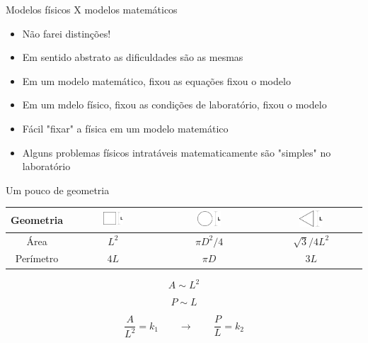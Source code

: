 \documentclass{beamer}
\newcommand{\lra}{\ensuremath{\longrightarrow}}
\newcommand{\qqrq}{\ensuremath{\qquad\lra\qquad}}
\begin{document}
\begin{frame}{Modelos físicos X modelos matemáticos}
  \begin{itemize}
  \item Não farei distinções!
  \item Em sentido abstrato as dificuldades são as mesmas
  \item Em um modelo matemático, fixou as equações fixou o modelo
  \item Em um mdelo físico, fixou as condições de laboratório, fixou o modelo
  \item Fácil "fixar" a física em um modelo matemático
  \item Alguns problemas físicos intratáveis matematicamente são "simples" no laboratório
  \end{itemize}
\end{frame}

\begin{frame}{Um pouco de geometria}
\centering
\begin{tabular}{|c|c|c|c|}
  \hline
  Geometria & 
    \includegraphics[width=0.25\textwidth]{./figuras/quadrado.pdf} & 
    \includegraphics[width=0.25\textwidth]{./figuras/circulo.pdf} & 
    \includegraphics[width=0.25\textwidth]{./figuras/triangulo.pdf}\\
    \hline
    Área & $L^2$ & $\pi D^2/4$ & $\sqrt{3}/4 L^2$ \\
    \hline
    Perímetro & $4L$ & $\pi D$ & $3L$ \\
    \hline
\end{tabular}

    \[ A \sim L^2 \]

    \[ P \sim L \]
    
\[
\frac{A}{L^2} = k_1 \qqrq \frac{P}{L} = k_2
\]

\end{frame}
\end{document}
